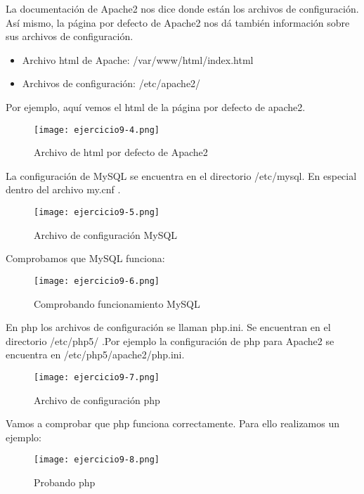\begin{itemize}
		La documentación de Apache2 nos dice donde están los archivos de configuración. Así mismo, la página por defecto de Apache2 nos dá también información sobre sus archivos de configuración.
		\begin{itemize}
			\item Archivo html de Apache: /var/www/html/index.html
			\item Archivos de configuración: /etc/apache2/
		\end{itemize}
		
		Por ejemplo, aquí vemos el html de la página por defecto de apache2.
		\begin{figure}[H]	
			\centering
			\texttt{[image: ejercicio9-4.png]} 
			\label{figura69} 
			\caption{Archivo de html por defecto de Apache2}
		\end{figure}
		
		La configuración de MySQL\cite{ejercicio9-4} se encuentra en el directorio /etc/mysql. En especial dentro del archivo my.cnf .
		\begin{figure}[H]	
			\centering
			\texttt{[image: ejercicio9-5.png]} 
			\label{figura70} 
			\caption{Archivo de configuración MySQL}
		\end{figure}
		 
		Comprobamos que MySQL funciona:
		\begin{figure}[H]	
			\centering
			\texttt{[image: ejercicio9-6.png]} 
			\label{figura71} 
			\caption{Comprobando funcionamiento MySQL}
		\end{figure}
		
		En php\cite{ejercicio9-5,ejercicio9-6} los archivos de configuración se llaman php.ini. Se encuentran en el directorio /etc/php5/ .Por ejemplo la configuración de php para Apache2 se encuentra en /etc/php5/apache2/php.ini.
		\begin{figure}[H]	
			\centering
			\texttt{[image: ejercicio9-7.png]} 
			\label{figura72} 
			\caption{Archivo de configuración php}
		\end{figure}
		
		Vamos a comprobar que php funciona correctamente. Para ello realizamos un ejemplo\cite{ejercicio9-7}:
		\begin{figure}[H]	
			\centering
			\texttt{[image: ejercicio9-8.png]} 
			\label{figura73} 
			\caption{Probando php}
		\end{figure}
	
	\end{itemize}
	
